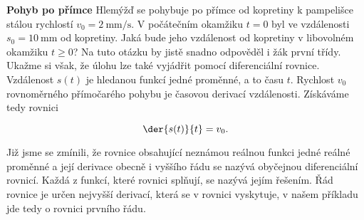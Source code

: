 \begin{mdframed}[style=mdexam]
  \begin{example}\label{mai:exam084}
    \textbf{Pohyb po přímce}\newline
    Hlemýžď se pohybuje po přímce od kopretiny k pampelišce stálou rychlostí \(v_0 =
    \qty{2}{\mm\per\s}\). V počátečním okamžiku \(t = 0\) byl ve vzdálenosti \(s_0 = \qty{10}{\mm}\)
    od kopretiny. Jaká bude jeho vzdálenost od kopretiny v libovolném okamžiku \(t\geq0\)? Na tuto
    otázku by jistě snadno odpověděl i žák první třídy. Ukažme si však, že úlohu lze také vyjádřit
    pomocí diferenciální rovnice. Vzdálenost \(s(t)\) je hledanou funkcí jedné proměnné, a to času
    \(t\). Rychlost \(v_0\) rovnoměrného přímočarého pohybu je časovou derivací vzdálenosti.
    Získáváme tedy rovnici

    {\centering
     \captionsetup{type=figure}
     \label{mai:fig055}
    \par}
    
    \begin{equation}\label{mai:eq076}
      \der{s(t)}{t} = v_0.
    \end{equation}

    Již jsme se zmínili, že rovnice obsahující neznámou reálnou funkci jedné reálné proměnné a její
    derivace obecně i vyššího řádu se nazývá obyčejnou diferenciální rovnicí. Každá z funkcí, které
    rovnici splňují, se nazývá jejím řešením. Řád rovnice je určen nejvyšší derivací, která se v
    rovnici vyskytuje, v našem příkladu jde tedy o rovnici prvního řádu.

    {\centering
     \captionsetup{type=figure}
     \label{mai:fig054}
    \par}
    

\end{example}
\end{mdframed}
